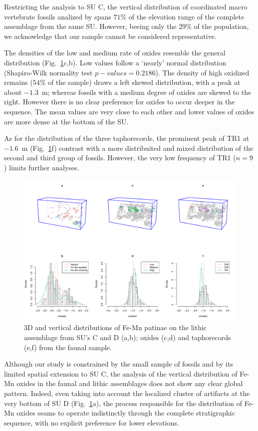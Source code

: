 \documentclass[review,authoryear]{elsarticle} %
\begin{document}
Restricting the analysis to SU C, the vertical distribution of coordinated macro vertebrate fossils analized by \cite{Bagnus2011} spans $71\%$ of the elevation range of the complete assemblage from the same SU. However, beeing only the $29\%$ of the population, we acknowledge that our sample cannot be considered representative.

The densities of the low and medium rate of oxides resemble the general distribution (Fig.~\ref{fig:4}c,b). Low values follow a ‘nearly’ normal distribution (Shapiro-Wilk normality test $p-values=0.2186$). The density of high oxidized remains ($54\%$ of the sample) draws a left skewed distribution, with a peak at about $-1.3$~m; whereas fossils with a medium degree of oxides are skewed to the right. However there is no clear preference for oxides to occur deeper in the sequence. The mean values are very close to each other and lower values of oxides are more dense at the bottom of the SU.

As for the distribution of the three taphorecords, the prominent peak of TR1 at $-1.6$~m (Fig.~\ref{fig:4}f) contrast with a more distribuited and mixed distribution of the second and third group of fossils. However, the very low frequency of TR1 ($n=9$) limits further analyses.

\begin{figure}
  \centering
  \includegraphics[width=1\textwidth]{../artwork/Fig4.pdf}
  \caption{3D and vertical distributions of Fe-Mn patinae on the lithic assemblage from SU's C and D (a,b); oxides (c,d) and taphorecords (e,f) from the faunal sample.}
  \label{fig:4}
\end{figure}

Although our study is constrained by the small sample of fossils and by its limited spatial extension to SU C, the analysis of the vertical distribution of Fe-Mn oxides in the faunal and lithic assemblages does not show any clear global pattern. Indeed, even taking into account the localized cluster of artifacts at the very bottom of SU D (Fig.~\ref{fig:4}a), the process responsible for the distribution of Fe-Mn oxides seams to operate indistinctly through the complete stratigraphic sequence, with no explicit preference for lower elevations.
\end{document}
